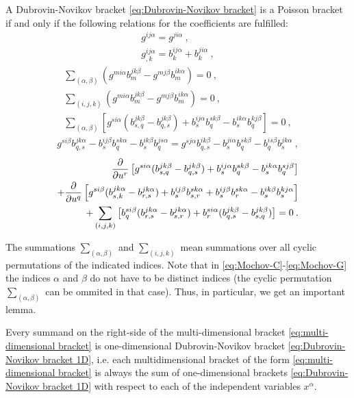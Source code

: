 \begin{theorem}
    A Dubrovin-Novikov bracket \eqref{eq:Dubrovin-Novikov bracket} is a Poisson bracket if and only if the following relations for the coefficients are fulfilled:
    \begin{align}
        g^{ij \alpha} = g^{ji \alpha} \:, \label{eq:Mochov-A} \\
        g^{ij \alpha}_{,k} = b^{ij \alpha}_k + b^{ji \alpha}_k \:, \label{eq:Mochov-B}
    \end{align}
    \begin{align}
        \sum_{(\alpha, \beta)} (g^{mi \alpha} b^{jk \beta}_m - g^{m j \beta} b^{i k \alpha}_m) = 0 \:, \label{eq:Mochov-C}\\
        \sum_{(i,j,k)} (g^{mi \alpha} b^{jk \beta}_m - g^{m j \beta} b^{ik \alpha}_m) = 0 \:, \label{eq:Mochov-D}\\
        \sum_{(\alpha, \beta)} \left[ g^{si \alpha} (b^{jk \beta}_{s,q} - b^{jk \beta}_{q,s} ) + b^{ij \alpha}_s b^{s k \beta}_q - b^{i k \alpha}_s b^{k j \beta}_q \right] = 0 \label{eq:Mochov-E}\:,
    \end{align}
    \begin{align}
        g^{si \beta} b^{j k \alpha}_{q,s} - b^{ij \beta}_s b^{s k \alpha}_q - b^{i k \beta}_s b^{j s \alpha}_q = g^{s j \alpha} b^{i k \beta}_{q,s} - b^{ji \alpha}_s b^{s k \beta}_q - b^{is \beta}_q b^{jk \alpha}_s \label{eq:Mochov-F}\:,
    \end{align}
    \begin{align}
        \frac{\partial }{\partial u^r} \left[ g^{si \alpha} (b^{j k \beta}_{s,q} - b^{j k \beta}_{q,s}) + b^{ij \alpha}_s b^{s k \beta}_q - b^{i k \alpha}_s b^{s j \beta}_q \right] 
        \nonumber \\+ \frac{\partial }{\partial u^q} \left[ g^{si \beta} (b^{j k  \alpha}_{s,k} - b^{j k \alpha}_{r,s}) + b^{ij \beta}_s b^{s k \alpha}_{s,r} + b^{ij \beta}_s b^{s k \alpha}_r - b^{i k \beta}_s b^{k j \alpha}_s \right] \label{eq:Mochov-G}
        \\+ \sum_{(i,j,k)} \left[ b^{si \beta}_q (b^{j k \alpha}_{r,s} - b^{j k \alpha}_{s,r}) + b^{s i \alpha}_r (b^{j k \beta}_{q,s} - b^{j k \beta}_{s,q}) \right] \nonumber
        = 0 \:.
    \end{align}
\end{theorem}
The summations $\sum_{(\alpha, \beta)}$ and $\sum_{(i,j,k)}$ mean summations over all cyclic permutations of the indicated indices. Note that in \eqref{eq:Mochov-C}-\eqref{eq:Mochov-G} the indices $\alpha$ and $\beta$ do not have to be distinct indices (the cyclic permutation $\sum_{(\alpha, \beta)}$ can be ommited in that case). Thus, in particular, we get an important lemma.
\begin{lemma}
    Every summand on the right-side of the multi-dimensional bracket \eqref{eq:multi-dimensional bracket} is one-dimensional Dubrovin-Novikov bracket \eqref{eq:Dubrovin-Novikov bracket 1D}, i.e. each multidimensional bracket of the form \eqref{eq:multi-dimensional bracket} is always the sum of one-dimensional brackets \eqref{eq:Dubrovin-Novikov bracket 1D} with respect to each of the independent variables $x^\alpha$.
\end{lemma}


